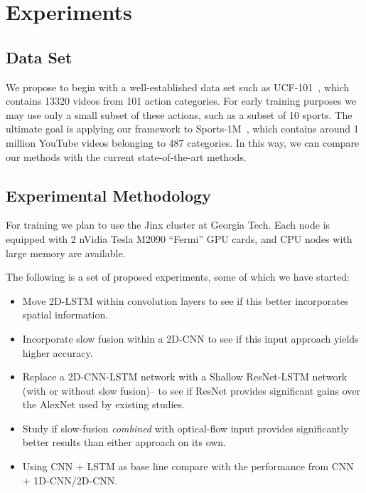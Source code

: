 \section{Experiments}
\subsection{Data Set}
We propose to begin with a well-established data set such as UCF-101~\cite{ucf101}, which contains 13320 videos from 101 action categories. For early training purposes we may use only a small subset of these actions, such as a subset of 10 sports. The ultimate goal is applying our framework to Sports-1M~\cite{cnnvid}, which contains around 1 million YouTube videos belonging to 487 categories. In this way, we can compare our methods with the current state-of-the-art methods.

\subsection{Experimental Methodology}
For training we plan to use the Jinx cluster at Georgia Tech. Each node is equipped with 2 nVidia Tesla M2090 ``Fermi'' GPU cards, and CPU nodes with large memory are available.

The following is a set of proposed experiments, some of which we have started:
\begin{itemize}
\item Move 2D-LSTM within convolution layers to see if this better incorporates spatial information.
\item Incorporate slow fusion within a 2D-CNN to see if this input approach yields higher accuracy.
\item Replace a 2D-CNN-LSTM network with a Shallow ResNet-LSTM network (with or without slow fusion)-- to see if ResNet provides significant gains over the AlexNet used by existing studies.
\item Study if slow-fusion \emph{combined} with optical-flow input provides significantly better results than either approach on its own.
\item Using CNN + LSTM as base line compare with the performance from CNN + 1D-CNN/2D-CNN.

\end{itemize}

